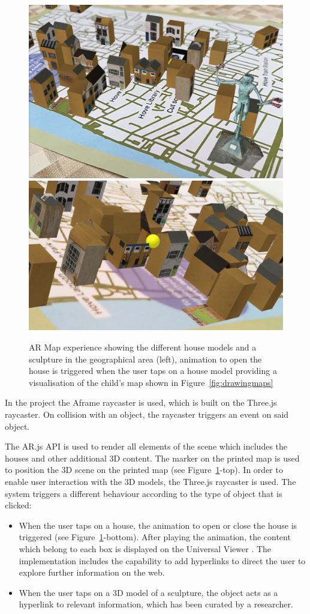 \documentclass[acmlarge,screen,dvipsnames]{acmart}
\begin{document}
\begin{figure}[ht] \centering
\includegraphics[width=0.6\linewidth]{images/ARcontentw_sculpture.png}
\includegraphics[width=0.6\linewidth]{images/animationARexperience_zoom.png}
\caption{AR Map experience showing the different house models and a sculpture in the geographical area (left),
 animation to open the house is triggered when the user taps on a house model providing a visualisation
 of the child's map shown in Figure~\ref{fig:drawingmaps}  } \label{fig:ARexperience}
\end{figure}
 
In the project the Aframe raycaster is used, which is built
on the Three.js raycaster. On collision with an object, the raycaster triggers
an event on said object. 

The AR.js API is used to render all elements of the scene which includes the
houses and other additional 3D content. The marker on the printed map is used
to position the 3D scene on the printed map (see
Figure~\ref{fig:ARexperience}-top). In order to enable user interaction with
the 3D models, the Three.js raycaster is used. The system triggers a different
behaviour according to the type of object that is clicked: 

\begin{itemize}
\item When the user taps on a house, the animation to open or close the house
is triggered (see Figure~\ref{fig:ARexperience}-bottom). After playing the
animation, the content which belong to each box is displayed on the Universal
Viewer \cite{uv}. The implementation includes the capability to add hyperlinks
to direct the user to explore further information on the web. 
\item When the
user taps on a 3D model of a sculpture, the object acts as a hyperlink to
relevant information, which has been curated by a researcher.  
\end{itemize}
\end{document}

